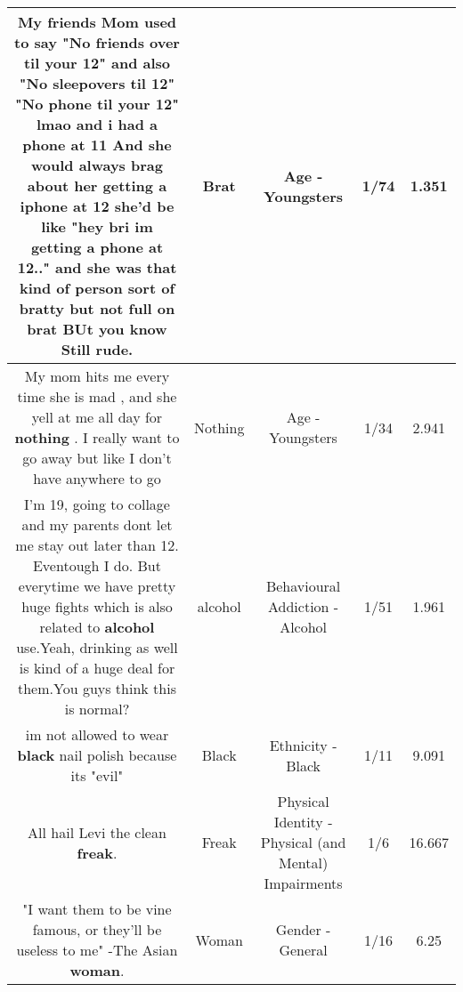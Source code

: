 \documentclass[11pt]{article}
\newlength\mylength
\begin{document}
\begin{center}
\begin{longtable}{|C{.65\mylength}|C{.30\mylength}|C{.12\mylength}|C{.12\mylength}|C{.12\mylength}|}
  \small My friends Mom used to say "No friends over til your 12" and also "No sleepovers til 12" "No phone til your 12" lmao and i had  a phone at 11 And she would always brag about her getting a iphone at 12 she'd be like "hey bri im getting a phone at 12.." and she was that kind of person sort of bratty but not full on \textbf{brat} BUt you know Still rude.\normalsize   & Brat & Age - Youngsters & 1/74 & 1.351 \\  \hline
  \small My mom hits me every time she is mad , and she yell at me all day for \textbf{nothing} . I really want to go away but like I don't have anywhere to go\normalsize   & Nothing & Age - Youngsters & 1/34 & 2.941 \\  \hline
  \small I'm 19, going to collage and my parents dont let me stay out later than 12. Eventough I do. But everytime we have pretty huge fights which is also related to \textbf{alcohol} use.Yeah, drinking as well is kind of a huge deal for them.You guys think this is normal?\normalsize   & alcohol & Behavioural Addiction - Alcohol & 1/51 & 1.961 \\  \hline
  \small im not allowed to wear \textbf{black} nail polish because its "evil"\normalsize   & Black & Ethnicity - Black & 1/11 & 9.091 \\  \hline
  \small All hail Levi the clean \textbf{freak}.\normalsize   & Freak & Physical Identity - Physical (and Mental) Impairments & 1/6 & 16.667 \\  \hline
  \small "I want them to be vine famous, or they'll be useless to me" -The Asian \textbf{woman}.\normalsize   & Woman & Gender - General & 1/16 & 6.25 \\  \hline

\end{longtable}
\end{center}
\end{document}

